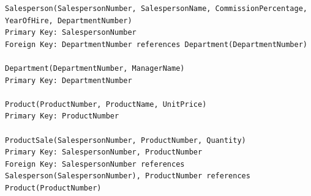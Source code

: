 \documentclass{article}
\begin{document}
\begin{lstlisting}
Salesperson(SalespersonNumber, SalespersonName, CommissionPercentage, YearOfHire, DepartmentNumber)
Primary Key: SalespersonNumber
Foreign Key: DepartmentNumber references Department(DepartmentNumber)

Department(DepartmentNumber, ManagerName)
Primary Key: DepartmentNumber

Product(ProductNumber, ProductName, UnitPrice)
Primary Key: ProductNumber

ProductSale(SalespersonNumber, ProductNumber, Quantity)
Primary Key: SalespersonNumber, ProductNumber
Foreign Key: SalespersonNumber references Salesperson(SalespersonNumber), ProductNumber references Product(ProductNumber)
\end{lstlisting}
\end{document}
